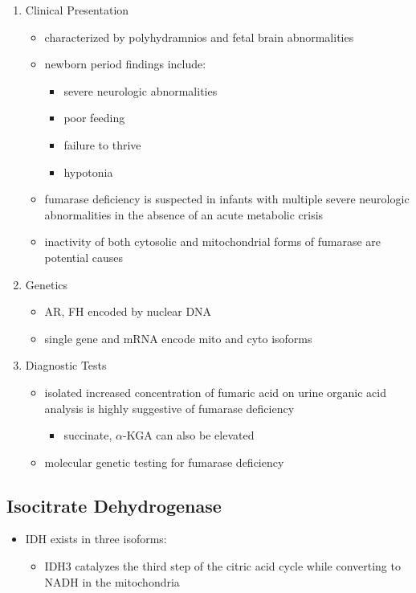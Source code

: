 \documentclass{scrartcl}
\begin{document}
\begin{enumerate}
\item Clinical Presentation
\label{sec:org6bae362}
\begin{itemize}
\item characterized by polyhydramnios and fetal brain abnormalities
\item newborn period findings include:
\begin{itemize}
\item severe neurologic abnormalities
\item poor feeding
\item failure to thrive
\item hypotonia
\end{itemize}
\item fumarase deficiency is suspected in infants with multiple severe
neurologic abnormalities in the absence of an acute metabolic crisis
\item inactivity of both cytosolic and mitochondrial forms of fumarase are
potential causes
\end{itemize}
\item Genetics
\label{sec:orgf267d39}
\begin{itemize}
\item AR, FH encoded by nuclear DNA
\item single gene and mRNA encode mito and cyto isoforms
\end{itemize}
\item Diagnostic Tests
\label{sec:org9ad5df5}
\begin{itemize}
\item isolated increased concentration of fumaric acid on urine organic
acid analysis is highly suggestive of fumarase deficiency
\begin{itemize}
\item succinate, \(\alpha\)-KGA can also be elevated
\end{itemize}
\item molecular genetic testing for fumarase deficiency
\end{itemize}
\end{enumerate}
\subsection{Isocitrate Dehydrogenase}
\label{sec:org305b726}
\begin{itemize}
\item IDH exists in three isoforms:
\begin{itemize}
\item IDH3 catalyzes the third step of the citric acid cycle while
converting  to NADH in the mitochondria
\end{itemize}
\end{itemize}
\end{document}
